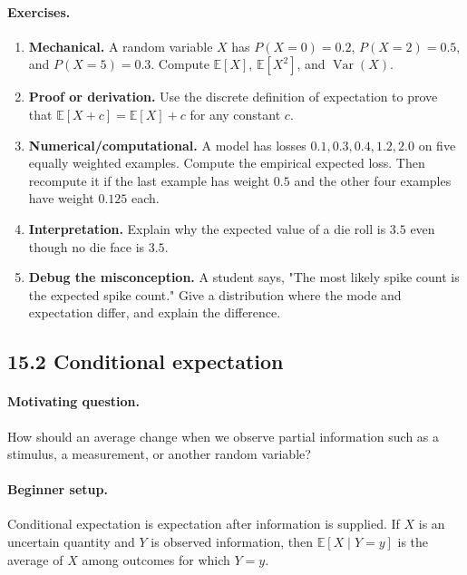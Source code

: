 \paragraph{Exercises.}
\begin{enumerate}[label=\textbf{15.1.\arabic*.}, leftmargin=*]
\item \textbf{Mechanical.} A random variable \(X\) has \(P(X=0)=0.2\), \(P(X=2)=0.5\), and \(P(X=5)=0.3\). Compute \(\mathbb{E}[X]\), \(\mathbb{E}[X^2]\), and \(\operatorname{Var}(X)\).
\item \textbf{Proof or derivation.} Use the discrete definition of expectation to prove that \(\mathbb{E}[X+c]=\mathbb{E}[X]+c\) for any constant \(c\).
\item \textbf{Numerical/computational.} A model has losses \(0.1,0.3,0.4,1.2,2.0\) on five equally weighted examples. Compute the empirical expected loss. Then recompute it if the last example has weight \(0.5\) and the other four examples have weight \(0.125\) each.
\item \textbf{Interpretation.} Explain why the expected value of a die roll is \(3.5\) even though no die face is \(3.5\).
\item \textbf{Debug the misconception.} A student says, "The most likely spike count is the expected spike count." Give a distribution where the mode and expectation differ, and explain the difference.
\end{enumerate}

\subsection{15.2 Conditional expectation}

\paragraph{Motivating question.}
How should an average change when we observe partial information such as a stimulus, a measurement, or another random variable?

\paragraph{Beginner setup.}
Conditional expectation is expectation after information is supplied. If \(X\) is an uncertain quantity and \(Y\) is observed information, then \(\mathbb{E}[X\mid Y=y]\) is the average of \(X\) among outcomes for which \(Y=y\).

